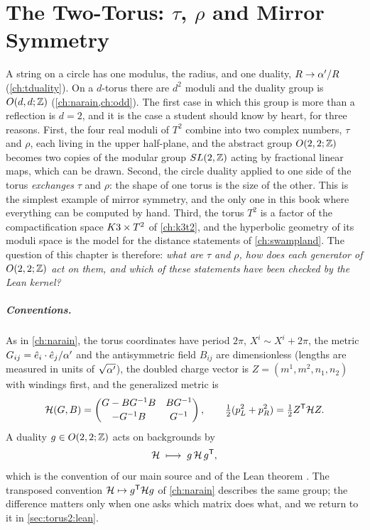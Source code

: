 \chapter{The Two-Torus: \texorpdfstring{$\tau$}{tau}, \texorpdfstring{$\rho$}{rho} and Mirror Symmetry}\label{ch:torus2}

A string on a circle has one modulus, the radius, and one duality, $R\to\alpha'/R$
(\cref{ch:tduality}). On a $d$-torus there are $d^2$ moduli and the duality group is
$O(d,d;\mathbb{Z})$ (\cref{ch:narain,ch:odd}). The first case in which this group is more than a
reflection is $d=2$, and it is the case a student should know by heart, for three reasons.
First, the four real moduli of $T^2$ combine into two complex numbers, $\tau$ and $\rho$,
each living in the upper half-plane, and the abstract group $O(2,2;\mathbb{Z})$ becomes two copies of
the modular group $SL(2,\mathbb{Z})$ acting by fractional linear maps, which can be drawn. Second, the
circle duality applied to one side of the torus \emph{exchanges} $\tau$ and $\rho$: the shape
of one torus is the size of the other. This is the simplest example of mirror
symmetry, and the only one in this book where everything can be
computed by hand. Third, the torus $T^2$ is a factor of the compactification space $K3\times T^2$ of
\cref{ch:k3t2}, and the hyperbolic geometry of its moduli space is the model for the distance
statements of \cref{ch:swampland}. The question of this chapter is therefore: \emph{what are
$\tau$ and $\rho$, how does each generator of $O(2,2;\mathbb{Z})$ act on them, and which of these
statements have been checked by the Lean kernel?}

\paragraph{Conventions.} As in \cref{ch:narain}, the torus coordinates have period $2\pi$,
$X^i\sim X^i+2\pi$, the metric $G_{ij}=\hat e_i\cdot\hat e_j/\alpha'$ and the antisymmetric field
$B_{ij}$ are dimensionless (lengths are measured in units of $\sqrt{\alpha'}$), the doubled
charge vector is $Z=(m^1,m^2,n_1,n_2)$ with windings first, and the generalized metric is
\begin{equation}\label{eq:torus2:genmetric}
 \mathcal{H}(G,B)=\begin{pmatrix}G-BG^{-1}B&BG^{-1}\\[2pt]-G^{-1}B&G^{-1}\end{pmatrix},
 \qquad \tfrac12(p_L^2+p_R^2)=\tfrac12 Z^{\mathsf T}\mathcal{H} Z .
\end{equation}
A duality $g\in O(2,2;\mathbb{Z})$ acts on backgrounds by
\begin{equation}\label{eq:torus2:action}
 \mathcal{H}\;\longmapsto\; g\,\mathcal{H}\,g^{\mathsf T},
\end{equation}
which is the convention of our main source 
and of the Lean theorem . The transposed convention
$\mathcal{H}\mapsto g^{\mathsf T}\mathcal{H} g$ of \cref{ch:narain} describes the same group; the difference
matters only when one asks which matrix does what, and we return to it in
\cref{sec:torus2:lean}.

